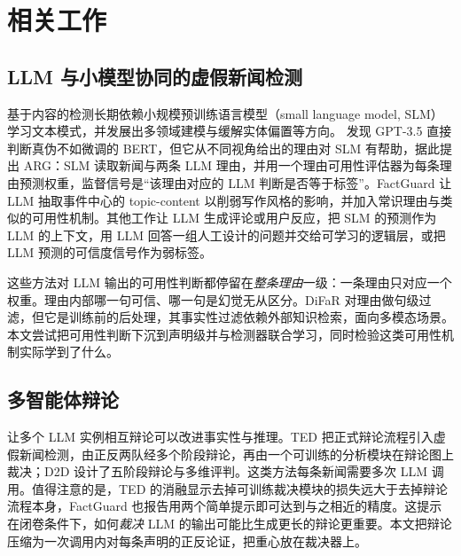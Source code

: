 \section{相关工作}\label{sec:related}

\subsection{LLM 与小模型协同的虚假新闻检测}

基于内容的检测长期依赖小规模预训练语言模型（small language model, SLM）学习文本模式\citep{shu2017fake,devlin2019bert}，并发展出多领域建模\citep{nan2021mdfend,zhu2023m3fend}与缓解实体偏置\citep{zhu2022endef}等方向。\citet{hu2024bad} 发现 GPT-3.5 直接判断真伪不如微调的 BERT，但它从不同视角给出的理由对 SLM 有帮助，据此提出 ARG：SLM 读取新闻与两条 LLM 理由，并用一个理由可用性评估器为每条理由预测权重，监督信号是“该理由对应的 LLM 判断是否等于标签”。FactGuard\citep{he2026factguard} 让 LLM 抽取事件中心的 topic-content 以削弱写作风格的影响，并加入常识理由与类似的可用性机制。其他工作让 LLM 生成评论或用户反应\citep{nan2024genfend,wan2024dell}，把 SLM 的预测作为 LLM 的上下文\citep{xu2024supericl}，用 LLM 回答一组人工设计的问题并交给可学习的逻辑层\citep{liu2024teller}，或把 LLM 预测的可信度信号作为弱标签\citep{leite2023pastel}。

这些方法对 LLM 输出的可用性判断都停留在\emph{整条理由}一级：一条理由只对应一个权重。理由内部哪一句可信、哪一句是幻觉无从区分。DiFaR\citep{wan2025difar} 对理由做句级过滤，但它是训练前的后处理，其事实性过滤依赖外部知识检索，面向多模态场景。本文尝试把可用性判断下沉到声明级并与检测器联合学习，同时检验这类可用性机制实际学到了什么。

\subsection{多智能体辩论}

让多个 LLM 实例相互辩论可以改进事实性与推理\citep{du2024debate,liang2024mad,chan2024chateval}。TED\citep{liu2025ted} 把正式辩论流程引入虚假新闻检测，由正反两队经多个阶段辩论，再由一个可训练的分析模块在辩论图上裁决；D2D\citep{han2025d2d} 设计了五阶段辩论与多维评判。这类方法每条新闻需要多次 LLM 调用。值得注意的是，TED 的消融显示去掉可训练裁决模块的损失远大于去掉辩论流程本身\citep{liu2025ted}，FactGuard 也报告用两个简单提示即可达到与之相近的精度\citep{he2026factguard}。这提示在闭卷条件下，如何\emph{裁决} LLM 的输出可能比生成更长的辩论更重要。本文把辩论压缩为一次调用内对每条声明的正反论证，把重心放在裁决器上。

